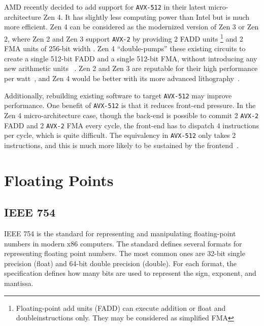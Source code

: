 \documentclass[logo,bsc,singlespacing,parskip]{infthesis}
\begin{document}
AMD recently decided to add support for \texttt{AVX-512} in their latest
micro-architecture Zen 4. It has slightly less computing power than
Intel but is much more efficient. Zen 4 can be considered as the modernized version of
Zen 3 or Zen 2, where Zen 2 and Zen 3 support \texttt{AVX-2}  by providing 2 FADD
units \footnote{Floating-point add units (FADD) can execute addition
or float and doubleinstructions only. They may be considered as simplified FMA} and 2 FMA units of
256-bit width \cite{Zen2ChipWiki}. Zen 4 ``double-pumps'' these existing circuits
to create a single 512-bit FADD and a single 512-bit FMA, without introducing
any new arithmetic units ~\cite{Zen4Critique}. Zen 2 and Zen 3 are reputable for
their high performance per watt~\cite{ZenPerfPerWatt}, and Zen 4 would be better
with its more advanced lithography~\cite{Zen4Critique}.

Additionally, rebuilding existing software to target \texttt{AVX-512} may
improve performance. One benefit of \texttt{AVX-512} is that it reduces
front-end pressure. In the Zen 4 micro-architecture case, though the back-end is
possible to commit 2 \texttt{AVX-2} FADD and 2 \texttt{AVX-2} FMA every cycle,
the front-end has to dispatch 4 instructions per cycle, which is quite
difficult. The equivalency in \texttt{AVX-512} only takes 2 instructions, and
this is much more likely to be sustained by the frontend~\cite{Zen4Critique}.


\section{Floating Points}
\label{sec:i23}
\subsection{IEEE 754}
\label{sec:IEEE754}
IEEE 754 is the standard for representing and manipulating floating-point
numbers in modern x86 computers. The standard defines several formats
for representing floating point numbers. The most common ones are 32-bit single
precision (float) and 64-bit double precision (double). For each format, the 
specification
defines how many bits are used to represent the sign, exponent, and mantissa. 
\end{document}
